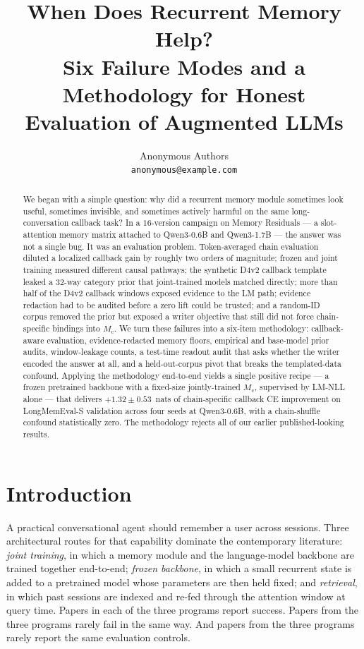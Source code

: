 \documentclass{article}
\title{When Does Recurrent Memory Help?\\
       Six Failure Modes and a Methodology for Honest Evaluation of Augmented LLMs}
\author{%
  Anonymous Authors\\
  \texttt{anonymous@example.com}
}
\newcommand{\Mc}{M_{\mathrm{c}}}
\begin{document}
\maketitle

\begin{abstract}
We began with a simple question: why did a recurrent memory module
sometimes look useful, sometimes invisible, and sometimes actively
harmful on the same long-conversation callback task?  In a
$16$-version campaign on Memory Residuals --- a slot-attention memory
matrix attached to Qwen3-0.6B and Qwen3-1.7B --- the answer was not a
single bug.  It was an evaluation problem.  Token-averaged chain
evaluation diluted a localized callback gain by roughly two orders of
magnitude; frozen and joint training measured different causal
pathways; the synthetic D4v2 callback template leaked a $32$-way
category prior that joint-trained models matched directly; more than
half of the D4v2 callback windows exposed evidence to the LM path;
evidence redaction had to be audited before a zero lift could be
trusted; and a random-ID corpus removed the prior but exposed a
writer objective that still did not force chain-specific bindings into
$\Mc$.  We turn these failures into a six-item methodology:
callback-aware evaluation, evidence-redacted memory floors, empirical
and base-model prior audits, window-leakage counts, a test-time
readout audit that asks whether the writer encoded the answer at all,
and a held-out-corpus pivot that breaks the templated-data confound.
Applying the methodology end-to-end yields a single positive recipe
--- a frozen pretrained backbone with a fixed-size jointly-trained
$\Mc$, supervised by LM-NLL alone --- that delivers
$+1.32 \pm 0.53$~nats of chain-specific callback CE improvement on
LongMemEval-S validation across four seeds at Qwen3-0.6B, with a
chain-shuffle confound statistically zero.  The methodology rejects
all of our earlier published-looking results.
\end{abstract}

\section{Introduction}
\label{sec:intro}

A practical conversational agent should remember a user across
sessions.  Three architectural routes for that capability dominate
the contemporary literature: \emph{joint training}, in which a memory
module and the language-model backbone are trained together
end-to-end; \emph{frozen backbone}, in which a small recurrent state
is added to a pretrained model whose parameters are then held fixed;
and \emph{retrieval}, in which past sessions are indexed and re-fed
through the attention window at query time.  Papers in each of the
three programs report success.  Papers from the three programs
rarely fail in the same way.  And papers from the three programs
rarely report the same evaluation controls.
\end{document}
